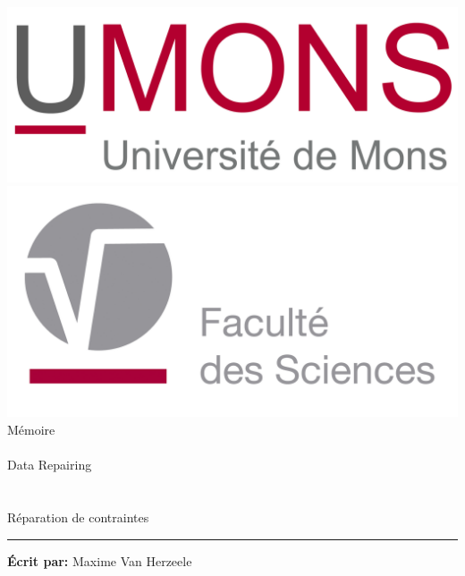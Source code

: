 \documentclass[letterpaper, 12pt]{report}
\theoremstyle{definition}
\begin{document}
\begin{titlepage}

\noindent


\begin{center}
\includegraphics[scale=0.2]{umonslogo}\\
\vspace*{0.7cm}
\includegraphics[scale=0.32]{fs-logo}\\
\vspace*{2.5cm}
\titlefont Mémoire\\~\\{\LARGE  Data Repairing\\}~\\~\\{\large Réparation de contraintes} \par
\end{center}
\vspace*{3.5cm}
\hfill
\begin{minipage}{0.18\linewidth}
  \begin{flushright}
   \rule{0.5pt}{75pt}
  \end{flushright}
\end{minipage}
\begin{minipage}{0.8\linewidth}
\begin{flushleft}
\textsf{\textbf{Écrit par:}} Maxime Van Herzeele\\

\end{flushleft}
\end{minipage}
\end{titlepage}
\end{document}
